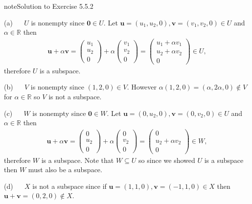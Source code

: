 \documentclass[letterpaper,10pt,english]{jupyterBook}
\begin{document}
\begin{sphinxadmonition}{note}{Solution to Exercise 5.5.2}



\sphinxAtStartPar
(a)   \(U\) is non\sphinxhyphen{}empty since \(\mathbf{0} \in U\). Let \(\mathbf{u} = (u_1, u_2, 0), \mathbf{v} = (v_1, v_2, 0) \in U\) and \(\alpha \in \mathbb{R}\) then
\begin{equation*}
\begin{split} \mathbf{u} + \alpha \mathbf{v} = 
    \begin{pmatrix} u_1 \\ u_2 \\ 0 \end{pmatrix} + \alpha 
    \begin{pmatrix} v_1 \\ v_2 \\ 0 \end{pmatrix} = 
    \begin{pmatrix} 
        u_1 + \alpha v_1 \\ 
        u_2 + \alpha v_2 \\ 
        0 
    \end{pmatrix} \in U, \end{split}
\end{equation*}
\sphinxAtStartPar
therefore \(U\) is a subspace.

\sphinxAtStartPar
(b)   \(V\) is non\sphinxhyphen{}empty since \((1,2,0) \in V\). However \(\alpha (1, 2, 0) = (\alpha , 2\alpha , 0) \notin V\) for \(\alpha \in \mathbb{R}\) so \(V\) is not a subspace.

\sphinxAtStartPar
(c)   \(W\) is non\sphinxhyphen{}empty since \(\mathbf{0} \in W\). Let \(\mathbf{u} = (0, u_2, 0), \mathbf{v} = (0, v_2, 0) \in U\) and \(\alpha \in \mathbb{R}\) then
\begin{equation*}
\begin{split} \mathbf{u} + \alpha \mathbf{v} = 
    \begin{pmatrix} 0 \\ u_2 \\ 0 \end{pmatrix} + \alpha 
    \begin{pmatrix} 0 \\ v_2 \\ 0 \end{pmatrix} = 
    \begin{pmatrix} 0 \\ u_2 + \alpha v_2 \\ 0 \end{pmatrix} \in W, \end{split}
\end{equation*}
\sphinxAtStartPar
therefore \(W\) is a subspace. Note that \(W \subseteq U\) so since we showed \(U\) is a subspace then \(W\) must also be a subspace.

\sphinxAtStartPar
(d)   \(X\) is not a subspace since if \(\mathbf{u} = (1, 1, 0), \mathbf{v} = (-1, 1, 0) \in X\) then \(\mathbf{u} + \mathbf{v} = (0, 2, 0) \notin X\).
\end{sphinxadmonition}
 \label{_pages/A5_Vector_spaces_exercises_solutions:_pages/A5_Vector_spaces_exercises_solutions-solution-2}
\end{document}
